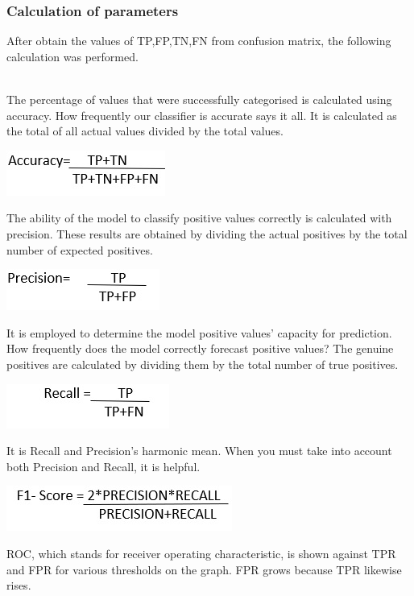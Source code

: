\subsubsection{Calculation of parameters}
After obtain the values of TP,FP,TN,FN from confusion
matrix, the following calculation was performed.\\
\\
\par The percentage of values that were successfully categorised is calculated using accuracy. How frequently our classifier is accurate says it all. It is calculated as the total of all actual values divided by the total values.
\begin{center}
    \includegraphics[]{V1.jpg}
\end{center}
\par The ability of the model to classify positive values correctly is calculated with precision. These results are obtained by dividing the actual positives by the total number of expected positives.
\begin{center}
    \includegraphics[]{V2.jpg}
\end{center}
\par It is employed to determine the model positive values' capacity for prediction. How frequently does the model correctly forecast positive values? The genuine positives are calculated by dividing them by the total number of true positives.
\begin{center}
    \includegraphics[]{V3.jpg}
\end{center}
\par It is Recall and Precision's harmonic mean. When you must take into account both Precision and Recall, it is helpful.
\begin{center}
    \includegraphics[]{V4.jpg}
\end{center}
\par ROC, which stands for receiver operating characteristic, is shown against TPR and FPR for various thresholds on the graph. FPR grows because TPR likewise rises.
